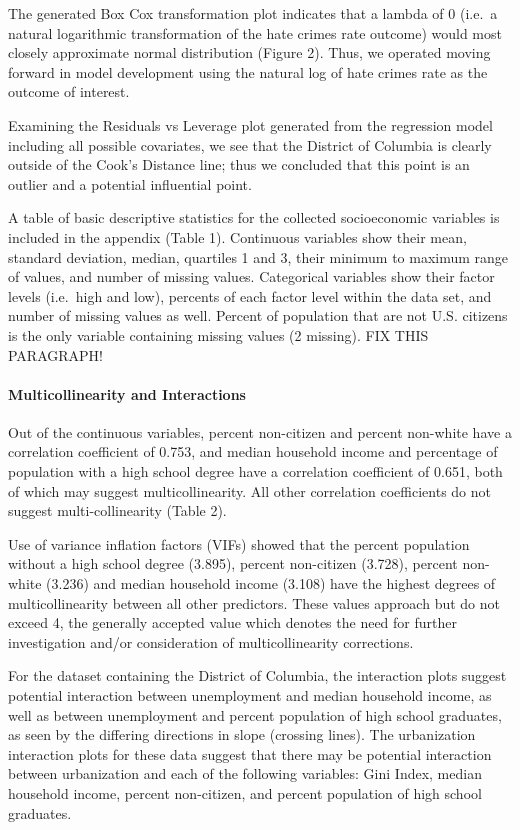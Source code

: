 \documentclass[
]{article}
\begin{document}
The generated Box Cox transformation plot indicates that a lambda of 0
(i.e.~a natural logarithmic transformation of the hate crimes rate
outcome) would most closely approximate normal distribution (Figure 2).
Thus, we operated moving forward in model development using the natural
log of hate crimes rate as the outcome of interest.

Examining the Residuals vs Leverage plot generated from the regression
model including all possible covariates, we see that the District of
Columbia is clearly outside of the Cook's Distance line; thus we
concluded that this point is an outlier and a potential influential
point.

A table of basic descriptive statistics for the collected socioeconomic
variables is included in the appendix (Table 1). Continuous variables
show their mean, standard deviation, median, quartiles 1 and 3, their
minimum to maximum range of values, and number of missing values.
Categorical variables show their factor levels (i.e.~high and low),
percents of each factor level within the data set, and number of missing
values as well. Percent of population that are not U.S. citizens is the
only variable containing missing values (2 missing). FIX THIS PARAGRAPH!

\hypertarget{multicollinearity-and-interactions-1}{%
\paragraph{Multicollinearity and
Interactions}\label{multicollinearity-and-interactions-1}}

Out of the continuous variables, percent non-citizen and percent
non-white have a correlation coefficient of 0.753, and median household
income and percentage of population with a high school degree have a
correlation coefficient of 0.651, both of which may suggest
multicollinearity. All other correlation coefficients do not suggest
multi-collinearity (Table 2).

Use of variance inflation factors (VIFs) showed that the percent
population without a high school degree (3.895), percent non-citizen
(3.728), percent non-white (3.236) and median household income (3.108)
have the highest degrees of multicollinearity between all other
predictors. These values approach but do not exceed 4, the generally
accepted value which denotes the need for further investigation and/or
consideration of multicollinearity corrections.

For the dataset containing the District of Columbia, the interaction
plots suggest potential interaction between unemployment and median
household income, as well as between unemployment and percent population
of high school graduates, as seen by the differing directions in slope
(crossing lines). The urbanization interaction plots for these data
suggest that there may be potential interaction between urbanization and
each of the following variables: Gini Index, median household income,
percent non-citizen, and percent population of high school graduates.
\end{document}
